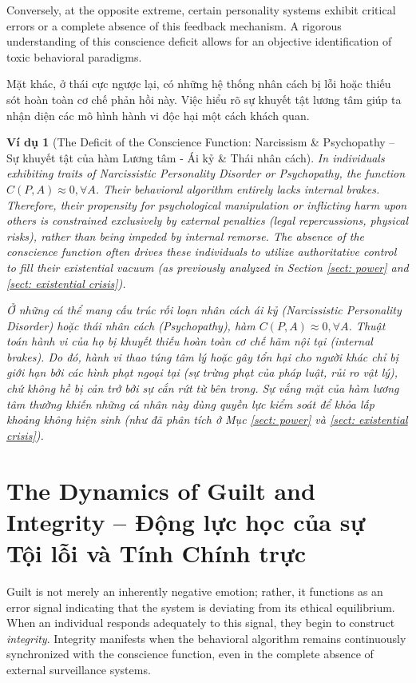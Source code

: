\documentclass{report}
\newtheorem{vidu}{Ví dụ}
\begin{document}
Conversely, at the opposite extreme, certain personality systems exhibit critical errors or a complete absence of this feedback mechanism. A rigorous understanding of this conscience deficit allows for an objective identification of toxic behavioral paradigms.

Mặt khác, ở thái cực ngược lại, có những hệ thống nhân cách bị lỗi hoặc thiếu sót hoàn toàn cơ chế phản hồi này. Việc hiểu rõ sự khuyết tật lương tâm giúp ta nhận diện các mô hình hành vi độc hại một cách khách quan.

\begin{vidu}[The Deficit of the Conscience Function: Narcissism \& Psychopathy -- Sự khuyết tật của hàm Lương tâm - Ái kỷ \& Thái nhân cách]
	In individuals exhibiting traits of Narcissistic Personality Disorder or Psychopathy, the function $C(P, A) \approx 0, \forall A$. Their behavioral algorithm entirely lacks internal brakes. Therefore, their propensity for psychological manipulation or inflicting harm upon others is constrained exclusively by external penalties (legal repercussions, physical risks), rather than being impeded by internal remorse. The absence of the conscience function often drives these individuals to utilize authoritative control to fill their existential vacuum (as previously analyzed in Section \ref{sect: power} and \ref{sect: existential crisis}).
	
	Ở những cá thể mang cấu trúc rối loạn nhân cách ái kỷ (Narcissistic Personality Disorder) hoặc thái nhân cách (Psychopathy), hàm $C(P, A) \approx 0, \forall A$. Thuật toán hành vi của họ bị khuyết thiếu hoàn toàn cơ chế hãm nội tại (internal brakes). Do đó, hành vi thao túng tâm lý hoặc gây tổn hại cho người khác chỉ bị giới hạn bởi các hình phạt ngoại tại (sự trừng phạt của pháp luật, rủi ro vật lý), chứ không hề bị cản trở bởi sự cắn rứt từ bên trong. Sự vắng mặt của hàm lương tâm thường khiến những cá nhân này dùng quyền lực kiểm soát để khỏa lấp khoảng không hiện sinh (như đã phân tích ở Mục \ref{sect: power} và \ref{sect: existential crisis}).
\end{vidu}

\section{The Dynamics of Guilt and Integrity -- Động lực học của sự Tội lỗi và Tính Chính trực}

Guilt is not merely an inherently negative emotion; rather, it functions as an error signal indicating that the system is deviating from its ethical equilibrium. When an individual responds adequately to this signal, they begin to construct \emph{integrity}. Integrity manifests when the behavioral algorithm remains continuously synchronized with the conscience function, even in the complete absence of external surveillance systems.
\end{document}
